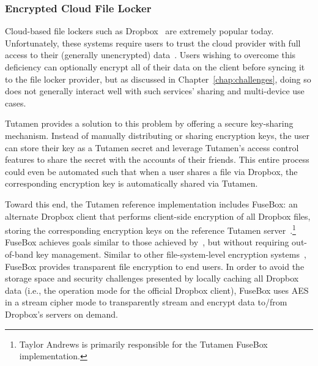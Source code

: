 \subsubsection{Encrypted Cloud File Locker}

Cloud-based file lockers such as Dropbox~\cite{dropbox} are extremely
popular today. Unfortunately, these systems require users to trust the
cloud provider with full access to their (generally unencrypted)
data~\cite{vintsurf-dropbox}. Users wishing to overcome this
deficiency can optionally encrypt all of their data on the client
before syncing it to the file locker provider, but as discussed in
Chapter~\ref{chap:challenges}, doing so does not generally interact
well with such services' sharing and multi-device use cases.

Tutamen provides a solution to this problem by offering a secure
key-sharing mechanism. Instead of manually distributing or sharing
encryption keys, the user can store their key as a Tutamen secret and
leverage Tutamen's access control features to share the secret with
the accounts of their friends. This entire process could even be
automated such that when a user shares a file via Dropbox, the
corresponding encryption key is automatically shared via Tutamen.

Toward this end, the Tutamen reference implementation includes
FuseBox: an alternate Dropbox client that performs client-side
encryption of all Dropbox files, storing the corresponding encryption
keys on the reference Tutamen server~\cite{fusebox}.\footnote{Taylor
  Andrews is primarily responsible for the Tutamen FuseBox
  implementation.} FuseBox achieves goals similar to those achieved
by~\cite{goh2003}, but without requiring out-of-band key
management. Similar to other file-system-level encryption
systems~\cite{blaze1993, Cattaneo2001, halcrow}, FuseBox provides
transparent file encryption to end users. In order to avoid the
storage space and security challenges presented by locally caching all
Dropbox data (i.e., the operation mode for the official Dropbox
client), FuseBox uses AES~\cite{daemen1999, nist2001} in a stream
cipher mode to transparently stream and encrypt data to/from
Dropbox's servers on demand.

